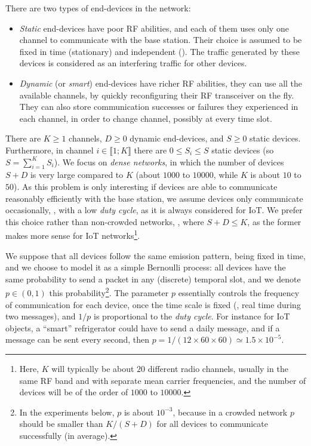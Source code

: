 There are two types of end-devices in the network:
\begin{itemize}
    \item
    \emph{Static} end-devices have poor RF abilities, and each of them uses only one channel to communicate with the base station. Their choice is assumed to be fixed in time (stationary) and independent (\iid). The traffic generated by these devices is considered as an interfering traffic for other devices.
    \item
    \emph{Dynamic} (or \emph{smart}) end-devices have richer RF abilities, they can use all the available channels, by quickly reconfiguring their RF transceiver on the fly. They can also store communication successes or failures they experienced in each channel, in order to change channel, possibly at every time slot.
\end{itemize}

There are $K \geq 1$ channels, $D \geq 0$ dynamic end-devices, and $S \geq 0$ static devices.
Furthermore, in channel $i \in \llbracket 1; K \rrbracket$ there are $0 \leq S_i \leq S$ static devices (so $S = \sum_{i=1}^{K} S_i$).
We focus on \emph{dense networks}, in which the number of devices $S + D$ is very large compared to $K$ (about $1000$ to $10000$, while $K$ is about $10$ to $50$).
As this problem is only interesting if devices are able to communicate reasonably efficiently with the base station, we assume devices only communicate occasionally, \ie, with a low \emph{duty cycle}, as it is always considered for IoT.
We prefer this choice rather than non-crowded networks, \ie, where $S + D \leq K$, as the former makes more sense for IoT networks\footnote{Here, $K$ will typically be about $20$ different radio channels, usually in the same RF band and with separate mean carrier frequencies, and the number of devices will be of the order of $1000$ to $10000$.}.

We suppose that all devices follow the same emission pattern, being fixed in time, and we choose to model it as a simple Bernoulli process:
all devices have the same probability to send a packet in any (discrete) temporal slot, and we denote $p \in (0, 1)$ this probability\footnote{In the experiments below, $p$ is about $10^{-3}$, because in a crowded network $p$ should be smaller than $K / (S + D)$ for all devices to communicate successfully (in average).}.
The parameter $p$ essentially controls the frequency of communication for each device, once the time scale is fixed (\ie, real time during two messages), and $1/p$ is proportional to the \emph{duty cycle}.
For instance for IoT objects, a ``smart'' refrigerator could have to send a daily message, and if a message can be sent every second, then $p = 1 / (12 \times 60 \times 60) \simeq 1.5 \times 10^{-5}$.

